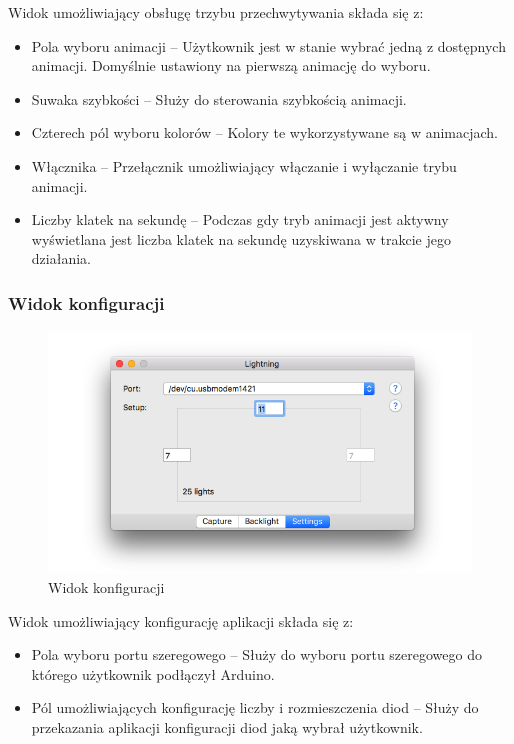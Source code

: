 \documentclass[12pt]{report}
\begin{document}
Widok umożliwiający obsługę trzybu przechwytywania składa się z:

\begin{itemize}
	\item Pola wyboru animacji -- Użytkownik jest w stanie wybrać jedną z dostępnych animacji. Domyślnie ustawiony na pierwszą animację do wyboru.
	\item Suwaka szybkości -- Służy do sterowania szybkością animacji.
	\item Czterech pól wyboru kolorów -- Kolory te wykorzystywane są w animacjach.
	\item Włącznika -- Przełącznik umożliwiający włączanie i wyłączanie trybu animacji.
	\item Liczby klatek na sekundę -- Podczas gdy tryb animacji jest aktywny wyświetlana jest liczba klatek na sekundę uzyskiwana w trakcie jego działania.
\end{itemize}

\newpage

\subsubsection{Widok konfiguracji}

\begin{figure}[h!]
\centering
\includegraphics[width=\textwidth]{../resources/settings.png}
\caption{Widok konfiguracji}
\end{figure}

Widok umożliwiający konfigurację aplikacji składa się z:

\begin{itemize}
	\item Pola wyboru portu szeregowego -- Służy do wyboru portu szeregowego do którego użytkownik podłączył Arduino.
	\item Pól umożliwiających konfigurację liczby i rozmieszczenia diod -- Służy do przekazania aplikacji konfiguracji diod jaką wybrał użytkownik. 
\end{itemize}
\end{document}
